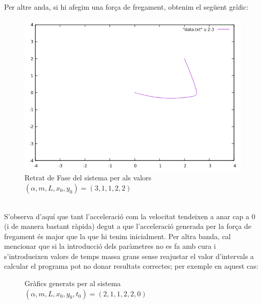 \documentclass[a4paper, 11pt]{article}
\begin{document}
Per altre anda, si hi afegim una força de fregament, obtenim el següent gràfic:\\
\begin{figure}[h]
    \centering
    \includegraphics[width = 0.8 \textwidth]{codo.png}
    \caption{Retrat de Fase del sistema per als valors $(\alpha, m, L,x_0,y_0) = (3,1,1,2,2)$}
    \label{retrat_fase}
\end{figure}\\
S'observa d'aquí que tant l'acceleració com la velocitat tendeixen a anar cap a 0 (i de manera bastant ràpida) degut a que l'acceleració generada per la força de fregament és major que la que hi tenim inicialment.
\newpage
\hspace{-1.5em}Per altra banda, cal mencionar que si la introducció dels paràmetres no es fa amb cura i s'introdueixen valors de temps massa grans sense reajustar el valor d'intervals a calcular el programa pot no donar resultats correctes; per exemple en aquest cas:
\begin{figure}[h]
 \centering
    \caption{Gràfics generats per al sistema $(\alpha, m, L,x_0,y_0,t_0) = (2,1,1,2,2,0)$}
\end{figure}
\newpage
\end{document}
